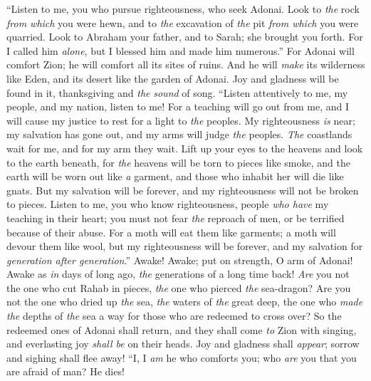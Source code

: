\begin{biblechapter} %
 “Listen to me, you who pursue righteousness, 
who seek Adonai. 
Look to \textit{the} rock \textit{from which} you were hewn, 
and to \textit{the} excavation of \textit{the} pit \textit{from which} you were quarried.
\verse Look to Abraham your father, 
and to Sarah; she brought you forth. 
For I called him \textit{alone}, 
but I blessed him and made him numerous.”
\verse For Adonai will comfort Zion; 
he will comfort all its sites of ruins. 
And he will \textit{make} its wilderness like Eden, 
and its desert like the garden of Adonai. 
Joy and gladness will be found in it, 
thanksgiving and \textit{the} \textit{sound} of song.
\verse “Listen attentively to me, my people, 
and my nation, listen to me! 
For a teaching will go out from me, 
and I will cause my justice to rest for a light to \textit{the} peoples.
\verse My righteousness \textit{is} near; my salvation has gone out, 
and my arms will judge \textit{the} peoples. 
\textit{The} coastlands wait for me, 
and for my arm they wait.
\verse Lift up your eyes to the heavens 
and look to the earth beneath, 
for \textit{the} heavens will be torn to pieces like smoke, 
and the earth will be worn out like \textit{a} garment, 
and those who inhabit her will die like gnats. 
But my salvation will be forever, 
and my righteousness will not be broken to pieces.
\verse Listen to me, you who know righteousness, 
people \textit{who have} my teaching in their heart; 
you must not fear \textit{the} reproach of men, 
or be terrified because of their abuse.
\verse For a moth will eat them like garments; 
a moth will devour them like wool, 
but my righteousness will be forever, 
and my salvation for \textit{generation after generation}.”
\verse Awake! Awake; put on strength, O arm of Adonai! 
Awake as \textit{in} days of long ago, 
\textit{the} generations of a long time back! 
\textit{Are} you not the one who cut Rahab in pieces, 
\textit{the} one who pierced \textit{the} sea-dragon?
\verse Are you not the one who dried up \textit{the} sea, 
\textit{the} waters of \textit{the} great deep, 
the one who \textit{made} \textit{the} depths of \textit{the} sea a way 
for those who are redeemed to cross over?
\verse So the redeemed ones of Adonai shall return, 
and they shall come \textit{to} Zion with singing, 
and everlasting joy \textit{shall be} on their heads. 
Joy and gladness shall \textit{appear}; 
sorrow and sighing shall flee away!
\verse “I, I \textit{am} he who comforts you; 
who \textit{are} you that you are afraid of man? He dies! 

\end{biblechapter}
